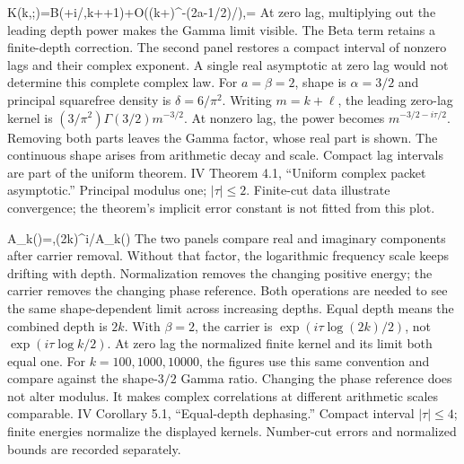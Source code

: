 {K(k,\ell;\tau)=\frac{\delta}{\beta}B(\alpha+i\tau/\beta,k+\ell+1)+O\!\left((k+\ell)^{-(2a-1/2)/\beta}\right),\quad\alpha=}
{At zero lag, multiplying out the leading depth power makes the Gamma limit visible. The Beta term retains a finite-depth correction. The second panel restores a compact interval of nonzero lags and their complex exponent. A single real asymptotic at zero lag would not determine this complete complex law.}
{For $a=\beta=2$, shape is $\alpha=3/2$ and principal squarefree density is $\delta=6/\pi^2$. Writing $m=k+\ell$, the leading zero-lag kernel is $(3/\pi^2)\Gamma(3/2)m^{-3/2}$. At nonzero lag, the power becomes $m^{-3/2-i\tau/2}$. Removing both parts leaves the Gamma factor, whose real part is shown.}
{The continuous shape arises from arithmetic decay and scale. Compact lag intervals are part of the uniform theorem.}
{IV Theorem 4.1, ``Uniform complex packet asymptotic.'' Principal modulus one; $|\tau|\le2$. Finite-cut data illustrate convergence; the theorem's implicit error constant is not fitted from this plot.}

{A_k(\tau)=,\qquad (2k)^{i\tau/\beta}A_k(\tau)\longrightarrow{}}
{The two panels compare real and imaginary components after carrier removal. Without that factor, the logarithmic frequency scale keeps drifting with depth. Normalization removes the changing positive energy; the carrier removes the changing phase reference. Both operations are needed to see the same shape-dependent limit across increasing depths.}
{Equal depth means the combined depth is $2k$. With $\beta=2$, the carrier is $\exp(i\tau\log(2k)/2)$, not $\exp(i\tau\log k/2)$. At zero lag the normalized finite kernel and its limit both equal one. For $k=100,1000,10000$, the figures use this same convention and compare against the shape-$3/2$ Gamma ratio.}
{Changing the phase reference does not alter modulus. It makes complex correlations at different arithmetic scales comparable.}
{IV Corollary 5.1, ``Equal-depth dephasing.'' Compact interval $|\tau|\le4$; finite energies normalize the displayed kernels. Number-cut errors and normalized bounds are recorded separately.}

